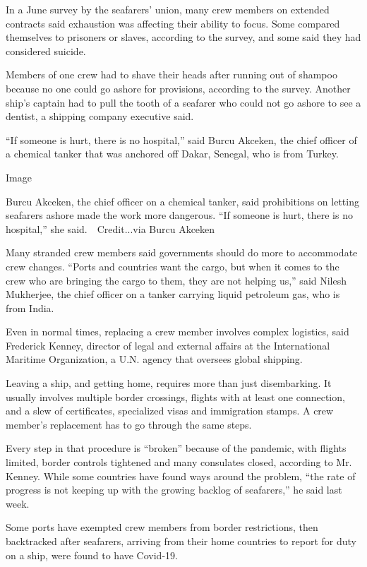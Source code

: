 In a June survey by the seafarers' union, many crew members on extended
contracts said exhaustion was affecting their ability to focus. Some
compared themselves to prisoners or slaves, according to the survey, and
some said they had considered suicide.

Members of one crew had to shave their heads after running out of
shampoo because no one could go ashore for provisions, according to the
survey. Another ship's captain had to pull the tooth of a seafarer who
could not go ashore to see a dentist, a shipping company executive said.

``If someone is hurt, there is no hospital,'' said Burcu Akceken, the
chief officer of a chemical tanker that was anchored off Dakar, Senegal,
who is from Turkey.

Image

Burcu Akceken, the chief officer on a chemical tanker, said prohibitions
on letting seafarers ashore made the work more dangerous. ``If someone
is hurt, there is no hospital,'' she said.~~Credit...via Burcu Akceken

Many stranded crew members said governments should do more to
accommodate crew changes. ``Ports and countries want the cargo, but when
it comes to the crew who are bringing the cargo to them, they are not
helping us,'' said Nilesh Mukherjee, the chief officer on a tanker
carrying liquid petroleum gas, who is from India.

Even in normal times, replacing a crew member involves complex
logistics, said Frederick Kenney, director of legal and external affairs
at the International Maritime Organization, a U.N. agency that oversees
global shipping.

Leaving a ship, and getting home, requires more than just disembarking.
It usually involves multiple border crossings, flights with at least one
connection, and a slew of certificates, specialized visas and
immigration stamps. A crew member's replacement has to go through the
same steps.

Every step in that procedure is ``broken'' because of the pandemic, with
flights limited, border controls tightened and many consulates closed,
according to Mr. Kenney. While some countries have found ways around the
problem, ``the rate of progress is not keeping up with the growing
backlog of seafarers,'' he said last week.

Some ports have exempted crew members from border restrictions, then
backtracked after seafarers, arriving from their home countries to
report for duty on a ship, were found to have Covid-19.

